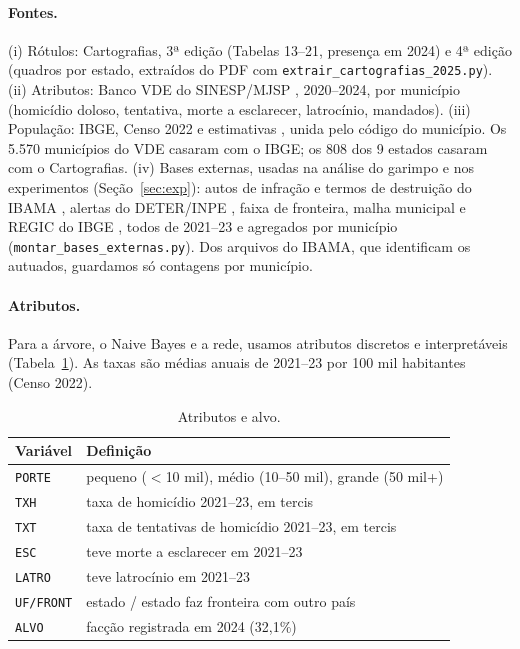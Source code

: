 \documentclass[10pt,a4paper,twocolumn]{article}
\begin{document}
\paragraph{Fontes.} (i) Rótulos: Cartografias, 3ª edição \cite{r4} (Tabelas 13--21,
presença em 2024) e 4ª edição \cite{r5} (quadros por estado, extraídos do PDF com
\texttt{extrair\_cartografias\_2025.py}). (ii) Atributos: Banco VDE do SINESP/MJSP
\cite{r6}, 2020--2024, por município (homicídio doloso, tentativa, morte a esclarecer,
latrocínio, mandados). (iii) População: IBGE, Censo 2022 e estimativas \cite{r7}, unida
pelo código do município. Os 5.570 municípios do VDE casaram com o IBGE; os 808 dos 9
estados casaram com o Cartografias. (iv) Bases externas, usadas na análise do garimpo e nos
experimentos (Seção~\ref{sec:exp}): autos de infração e termos de destruição do IBAMA
\cite{r8}, alertas do DETER/INPE \cite{r9}, faixa de fronteira, malha municipal e REGIC do
IBGE \cite{r7}, todos de 2021--23 e agregados por município
(\texttt{montar\_bases\_externas.py}). Dos arquivos do IBAMA, que identificam os autuados,
guardamos só contagens por município.

\paragraph{Atributos.} Para a árvore, o Naive Bayes e a rede, usamos atributos discretos e
interpretáveis (Tabela~\ref{tab:attr}). As taxas são médias anuais de 2021--23 por 100 mil
habitantes (Censo 2022).

\begin{table}[t]
\centering\small
\begin{tabular}{@{}lp{5.6cm}@{}}
\toprule
Variável & Definição\\
\midrule
\texttt{PORTE} & pequeno ($<$10 mil), médio (10--50 mil), grande (50 mil+)\\
\texttt{TXH} & taxa de homicídio 2021--23, em tercis\\
\texttt{TXT} & taxa de tentativas de homicídio 2021--23, em tercis\\
\texttt{ESC} & teve morte a esclarecer em 2021--23\\
\texttt{LATRO} & teve latrocínio em 2021--23\\
\texttt{UF/FRONT} & estado / estado faz fronteira com outro país\\
\texttt{ALVO} & facção registrada em 2024 (32,1\%)\\
\bottomrule
\end{tabular}
\caption{Atributos e alvo.}\label{tab:attr}
\end{table}
\end{document}

